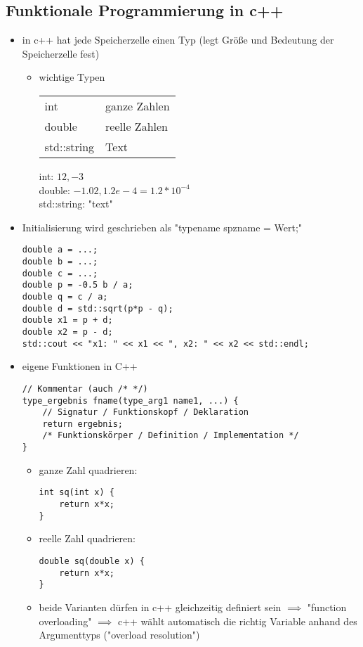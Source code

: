 \documentclass[a4paper]{scrartcl}
\theoremstyle{definition}
\theoremstyle{plain}
\theoremstyle{remark}
\theoremstyle{remark}
\begin{document}
\subsection{Funktionale Programmierung in c++}
\label{sec-6-3}
\begin{itemize}
\item in c++ hat jede Speicherzelle einen Typ (legt Größe und Bedeutung der Speicherzelle fest)
\begin{itemize}
\item wichtige Typen
\begin{center}
\begin{tabular}{ll}
int & ganze Zahlen\\
double & reelle Zahlen\\
std::string & Text\\
\end{tabular}
\end{center}
int: $12,-3$ \\
       double: $-1.02,1.2e-4 = 1.2*10^{-4}$ \\
       std::string: "text"
\end{itemize}
\item Initialisierung wird geschrieben als "typename spzname = Wert;"
\begin{verbatim}
double a = ...;
double b = ...;
double c = ...;
double p = -0.5 b / a;
double q = c / a;
double d = std::sqrt(p*p - q);
double x1 = p + d;
double x2 = p - d;
std::cout << "x1: " << x1 << ", x2: " << x2 << std::endl;
\end{verbatim}
\item eigene Funktionen in C++
\begin{verbatim}
// Kommentar (auch /* */)
type_ergebnis fname(type_arg1 name1, ...) {
	// Signatur / Funktionskopf / Deklaration
	return ergebnis;
	/* Funktionskörper / Definition / Implementation */
}
\end{verbatim}
\begin{itemize}
\item ganze Zahl quadrieren:
\begin{verbatim}
int sq(int x) {
	return x*x;
}
\end{verbatim}
\item reelle Zahl quadrieren:
\begin{verbatim}
double sq(double x) {
	return x*x;
}
\end{verbatim}
\item beide Varianten dürfen in c++ gleichzeitig definiert sein $\implies$ "function overloading" $\implies$ c++ wählt automatisch die richtig Variable anhand des Argumenttyps ("overload resolution")

\end{itemize}
\end{itemize}
\end{document}
